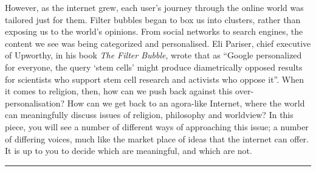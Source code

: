 \documentclass[]{article}
\begin{document}
However, as the internet grew, each user's journey through the online
world was tailored just for them. Filter bubbles began to box us into
clusters, rather than exposing us to the world's opinions. From social
networks to search engines, the content we see was being categorized and
personalised. Eli Pariser, chief executive of Upworthy, in his book
\emph{The Filter Bubble}, wrote that as ``Google personalized for
everyone, the query `stem cells' might produce diametrically opposed
results for scientists who support stem cell research and activists who
oppose it''\autocite[pg 2]{PariserFilterBubblewhat2012}. When it comes
to religion, then, how can we push back against this
over-personalisation? How can we get back to an agora-like Internet,
where the world can meaningfully discuss issues of religion, philosophy
and worldview? In this piece, you will see a number of different ways of
approaching this issue; a number of differing voices, much like the
market place of ideas that the internet can offer. It is up to you to
decide which are meaningful, and which are not.

\begin{center}\rule{0.5\linewidth}{\linethickness}\end{center}
\end{document}
